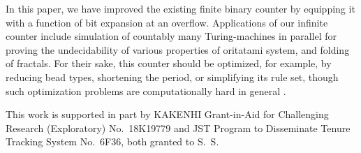 \documentclass[twocolumn]{svjour3}
\begin{document}
In this paper, we have improved the existing finite binary counter by equipping it with a function of bit expansion at an overflow.
Applications of our infinite counter include simulation of countably many Turing-machines in parallel for proving the undecidability of various properties of oritatami system, and folding of fractals.
For their sake, this counter should be optimized, for example, by reducing bead types, shortening the period, or simplifying its rule set, though such optimization problems are computationally hard in general \cite{HanKim2019,OtaSeki2017}.




\begin{acknowledgements}
This work is supported in part by 
KAKENHI Grant-in-Aid for Challenging Research (Exploratory) No.~18K19779 and 
JST Program to Disseminate Tenure Tracking System No.~6F36, both granted to S.~S.
\end{acknowledgements}
\end{document}

